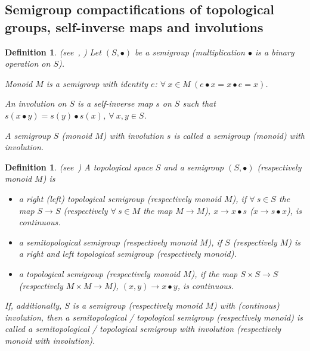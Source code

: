 \documentclass{amsart}
\newtheorem{df}[thm]{Definition}
\begin{document}
\subsection{Semigroup compactifications of topological groups, self-inverse maps and involutions}\label{seminv}

\begin{df} {\rm (see~\cite{CliffPrest}, \cite{Lawson})}
Let $(S, \bullet)$ be a semigroup {\rm(}multiplication $\bullet$ is a binary operation on $S${\rm)}. 

Monoid $M$ is a semigroup with identity $e$: $\forall\ x\in M\ (e\bullet x=x\bullet e=x)$.

\medskip

An involution on $S$ is a self-inverse map $s$ on $S$ such that $s(x\bullet y)=s(y)\bullet s(x)$, $\forall\ x, y\in S$.

A semigroup $S$ {\rm(}monoid $M${\rm)} with involution $s$ is called a semigroup {\rm(}monoid{\rm)} with involution.
\end{df}

\begin{df} {\rm(see~\cite{ArhTk})} 
A topological space $S$ and a semigroup $(S, \bullet)$ {\rm(}respectively monoid $M${\rm)} is 
\begin{itemize}
\item a right {\rm(}left{\rm)} topological semigroup {\rm(}respectively monoid $M${\rm)}, if $\forall\ s\in S$ the map $S\to S$   {\rm(}respectively $\forall\ s\in M$ the map $M\to M${\rm)},  $x\to x\bullet s$ {\rm(}$x\to s\bullet x${\rm)}, is continuous. 
\item a semitopological semigroup {\rm(}respectively monoid $M${\rm)}, if $S$  {\rm(}respectively $M${\rm)} is a right and left topological semigroup {\rm(}respectively monoid{\rm)}. 
\item a topological semigroup {\rm(}respectively monoid $M${\rm)}, if the map $S\times S\to S$ {\rm(}respectively $M\times M\to M${\rm)}, $(x, y)\to x\bullet y$, is continuous.  
\end{itemize}

If, additionally, $S$ is a semigroup {\rm(}respectively monoid $M${\rm)} with {\rm(}continous{\rm)} involution, then a semitopological / topological semigroup {\rm(}respectively monoid{\rm)} is called a  semitopological / topological semigroup  with involution {\rm(}respectively monoid  with involution{\rm)}.
\end{df}
\end{document}
